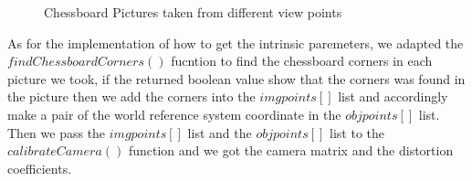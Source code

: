 \documentclass[10pt,twocolumn,letterpaper]{article}
\begin{document}
\begin{figure}[t]
{}


\caption{Chessboard Pictures taken from different view points}
\label{fig:chessboard}
\end{figure}

As for the implementation of how to get the intrinsic paremeters, we adapted the $findChessboardCorners( )$ fucntion to find the chessboard corners in each picture we took, if the returned boolean value show that the corners was found in the picture then we add the corners into the $imgpoints[ ]$ list and accordingly make a pair of the world reference system coordinate in the $objpoints[ ]$ list. Then we pass the $imgpoints[ ]$ list and the $objpoints[ ]$ list to the $calibrateCamera( )$ function and we got the camera matrix and the distortion coefficients. 
\end{document}
